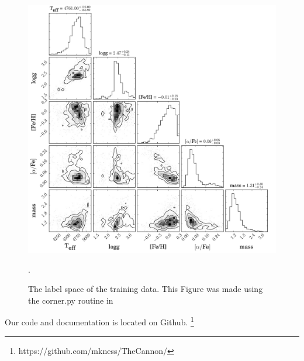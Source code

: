 \documentclass[12pt, preprint]{aastex}
\begin{document}
\begin{figure}[h]
\centering
        \includegraphics[scale=0.45]{./plots/training.pdf}
  \caption{The label space of the training data. This Figure was made using the corner.py routine in \citet{dfm}}.
\label{fig:triangle}
\end{figure}

Our code and documentation is located on Github. \footnote{https://github.com/mkness/TheCannon/}
\end{document}
